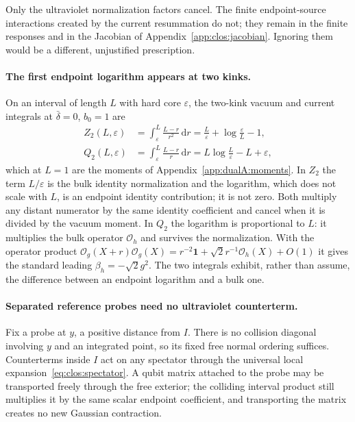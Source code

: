 \documentclass[11pt,a4paper]{article}
\numberwithin{equation}{section}
\newcommand{\dd}{\,\mathrm d}
\newcommand{\db}{\bar\delta}
\newcommand{\Og}{\mathcal O_g}
\newcommand{\Oh}{\mathcal O_h}
\begin{document}
Only the ultraviolet normalization factors cancel. The finite endpoint-source interactions created by the current
resummation do not; they remain in the finite responses and in the Jacobian of Appendix~\ref{app:clos:jacobian}.
Ignoring them would be a different, unjustified prescription.

\paragraph{The first endpoint logarithm appears at two kinks.} On an interval of length $L$ with hard core
$\varepsilon$, the two-kink vacuum and current integrals at $\db=0$, $b_0=1$ are
\begin{align}
 Z_2(L,\varepsilon)&=\int_\varepsilon^L\frac{L-r}{r^2}\dd r=\frac L\varepsilon+\log\frac\varepsilon L-1,
 \label{eq:clos:Z2}\\
 Q_2(L,\varepsilon)&=\int_\varepsilon^L\frac{L-r}{r}\dd r=L\log\frac L\varepsilon-L+\varepsilon,
 \label{eq:clos:Q2}
\end{align}
which at $L=1$ are the moments of Appendix~\ref{app:dualA:moments}. In $Z_2$ the term $L/\varepsilon$ is the bulk
identity normalization and the logarithm, which does not scale with $L$, is an endpoint identity contribution; it is
not zero. Both multiply any distant numerator by the same identity coefficient and cancel when it is divided by the
vacuum moment. In $Q_2$ the logarithm is proportional to $L$: it multiplies the bulk operator $\Oh$ and survives the
normalization. With the operator product $\Og(X+r)\Og(X)=r^{-2}\mathbf 1+\sqrt2r^{-1}\Oh(X)+O(1)$ it gives the
standard leading $\beta_h=-\sqrt2g^2$. The two integrals exhibit, rather than assume, the difference between an
endpoint logarithm and a bulk one.

\paragraph{Separated reference probes need no ultraviolet counterterm.} Fix a probe at $y$, a positive distance from
$I$. There is no collision diagonal involving $y$ and an integrated point, so its fixed free normal ordering suffices.
Counterterms inside $I$ act on any spectator through the universal local expansion~\eqref{eq:clos:spectator}. A qubit
matrix attached to the probe may be transported freely through the free exterior; the colliding interval product still
multiplies it by the same scalar endpoint coefficient, and transporting the matrix creates no new Gaussian
contraction.
\end{document}
